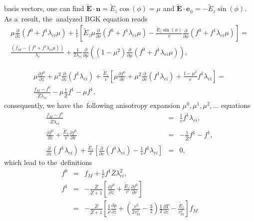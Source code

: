 \documentclass[preprint,12pt]{elsarticle}
\newcommand{\pdv}[2]{\frac{\partial{#1}}{\partial{#2}}}
\newcommand{\vect}[1]{\boldsymbol{#1}}
\newcommand{\mfpe}{\lambda_e}
\newcommand{\mfpei}{\lambda_{ei}}
\newcommand{\Zbar}{\bar{Z}}
\newcommand{\vmag}{v}
\newcommand{\vth}{v_{th}}
\newcommand{\vn}{\vect{n}}
\newcommand{\tE}{\vect{\tilde{E}}}
\newcommand{\fM}{f_M}
\begin{document}
basis vectors, one can find $\tE\cdot\vn = \tilde{E}_z \cos(\phi) = \mu$ and
$\tE\cdot\vect{e}_\phi = -\tilde{E}_z\sin(\phi)$. As a~result, the~analyzed
BGK equation reads
\begin{multline}
  \mu\pdv{}{z}\left( f^0 + f^1 \mfpei\mu \right) 
  + \frac{1}{\vmag} \left[ \tilde{E}_z\mu \pdv{}{\vmag} 
  \left( f^0 + f^1 \mfpei\mu \right) 
  - \frac{\tilde{E}_z\sin(\phi)}{\vmag}\pdv{}{\phi} 
  \left( f^0 + f^1 \mfpei\mu \right)
  \right] 
  =\\
  \frac{\left(\fM - \left( f^0 + f^1 \mfpei\mu \right) \right)}{\mfpe} 
  + \frac{1}{2 \mfpei}\pdv{}{\mu}\left((1 - \mu^2)
  \pdv{}{\mu}\left( f^0 + f^1 \mfpei\mu \right) \right) ,
  \label{eq:BGK_spherical}
\end{multline}

\begin{multline}
  \mu\pdv{f^0}{z} + \mu^2 \pdv{}{z}\left(f^1 \mfpei \right)
  + \frac{\tilde{E}_z}{\vmag} \left[ \mu \pdv{f^0}{\vmag} 
  + \mu^2 \pdv{}{\vmag} \left( f^1 \mfpei \right) 
  + \frac{1 - \mu^2}{\vmag}f^1 \mfpei
  \right] 
  =\\
  \frac{\fM - f^0}{\Zbar\mfpei} - \mu \frac{1}{\Zbar}f^1
  - \mu f^1 ,
  \label{eq:BGK_spherical}
\end{multline}
consequently, we have the~following anisotropy expansion 
$\mu^0, \mu^1, \mu^2, ...$ equations
\begin{eqnarray}
  \frac{\fM - f^0}{\Zbar\mfpei} &=& \frac{1}{\vmag}f^1 \mfpei , 
  \nonumber \\
  \pdv{f^0}{z} + \frac{\tilde{E}_z}{\vmag}\pdv{f^0}{\vmag} &=& 
  - \frac{1}{\Zbar}f^1 - f^1 , 
  \nonumber \\ 
  \pdv{}{z}\left(f^1 \mfpei \right) 
  + \frac{\tilde{E}_z}{\vmag} \left[\pdv{}{\vmag} \left( f^1 \mfpei \right)
  - \frac{1}{\vmag}f^1 \mfpei \right] &=& 0 , \nonumber
\end{eqnarray}
which lead to the~definitions
\begin{eqnarray}
  f^0 &=& \fM + \frac{1}{\vmag}f^1 \Zbar\mfpei^2 ,
  \label{eq:BGK_f0} \\
  f^1 &=& - \frac{\Zbar}{\Zbar+1}
  \left[ \pdv{f^0}{z} + \frac{\tilde{E}_z}{\vmag}\pdv{f^0}{\vmag} \right] 
  \nonumber \\
  &=& - \frac{\Zbar}{\Zbar+1}
  \left[\frac{1}{\rho}\pdv{\rho}{z} + 
  \left( \frac{\vmag^2}{2 \vth^2} - \frac{3}{2}\right)
  \frac{1}{T}\pdv{T}{z} - \frac{\tilde{E}_z}{\vth^2} \right]\fM 
  \label{eq:BGK_f1}
\end{eqnarray}
\end{document}

